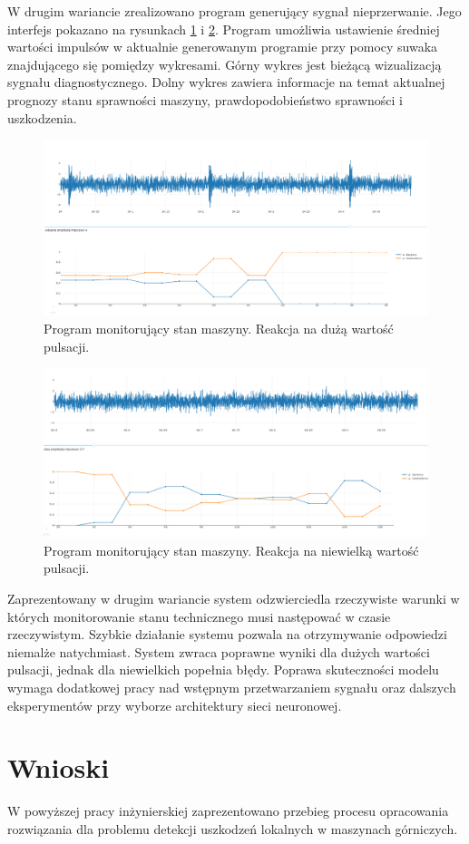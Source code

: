 \documentclass[inzynierska]{pwr_wmat_praca_dyplomowa}
\theoremstyle{plain}
\numberwithin{theorem}{chapter}
\theoremstyle{definition}
\numberwithin{theorem}{chapter}
\begin{document}
W drugim wariancie zrealizowano program generujący sygnał nieprzerwanie. Jego interfejs pokazano na rysunkach \ref{monitor_live_1} i \ref{monitor_live_2}. Program umożliwia ustawienie średniej wartości impulsów w aktualnie generowanym programie przy pomocy suwaka znajdującego się pomiędzy wykresami. Górny wykres jest bieżącą wizualizacją sygnału diagnostycznego. Dolny wykres zawiera informacje na temat aktualnej prognozy stanu sprawności maszyny, prawdopodobieństwo sprawności i uszkodzenia.
\begin{figure}[ht]
	\centering
	\includegraphics[scale=0.4]{images/monitor_live_1.png}
	\caption{Program monitorujący stan maszyny. Reakcja na dużą wartość pulsacji.}
	\label{monitor_live_1}
\end{figure}

\begin{figure}[H]
	\centering
	\includegraphics[scale=0.4]{images/monitor_live_2.png}
	\caption{Program monitorujący stan maszyny. Reakcja na niewielką wartość pulsacji.}
	\label{monitor_live_2}
\end{figure}

Zaprezentowany w drugim wariancie system odzwierciedla rzeczywiste warunki w których monitorowanie stanu technicznego musi następować w czasie rzeczywistym. Szybkie działanie systemu pozwala na otrzymywanie odpowiedzi niemalże natychmiast. System zwraca poprawne wyniki dla dużych wartości pulsacji, jednak dla niewielkich popełnia błędy. Poprawa skuteczności modelu wymaga dodatkowej pracy nad wstępnym przetwarzaniem sygnału oraz dalszych eksperymentów przy wyborze architektury sieci neuronowej.
{\backmatter \chapter{Wnioski}}
W powyższej pracy inżynierskiej zaprezentowano przebieg procesu opracowania rozwiązania dla problemu detekcji uszkodzeń lokalnych w maszynach górniczych.
\end{document}
